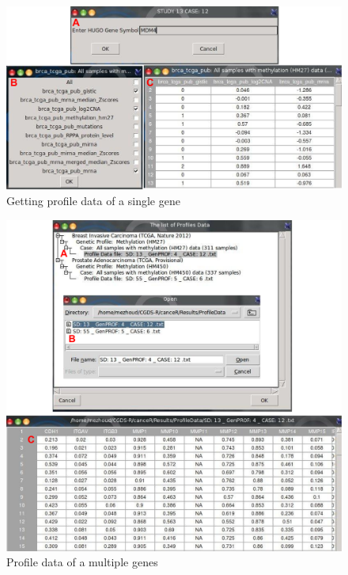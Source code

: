 \documentclass[a4paper]{article}
\begin{document}
\begin{figure}[!ht]
 \centering
\includegraphics[scale=0.5]{image/singleProfile.png}
\caption{Getting profile data of a single gene}
\label{Fig10}
\end{figure}



\begin{figure}[!ht]
 \centering
\includegraphics[scale=1]{image/multipleProfiles.png}
\caption{Profile data of a multiple genes}
\label{Fig11}
\end{figure}
\end{document}
